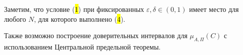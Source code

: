 Заметим, что условие (\hl{1}) при фиксированных $\varepsilon,\delta \in (0,1)$ имеет место для любого $N$, для которого выполнено (\hl{4}).

Также возможно построение доверительных интервалов для $\mu_{A,\Pi}(C)$ с использованием Центральной предельной теоремы.







